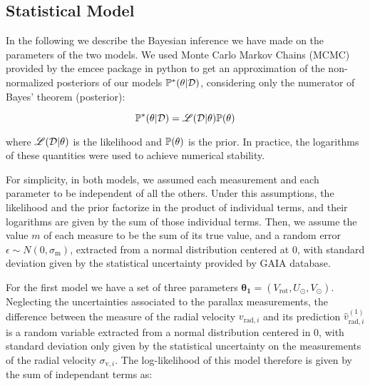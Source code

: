 \subsection{Statistical Model}\label{subsec:StatisticalModel}
In the following we describe the Bayesian inference we have made on the parameters of the two models. 
We used Monte Carlo Markov Chains (MCMC) provided by the emcee package in python 
to get an approximation of the non-normalized posteriors of our models 
$\mathbb{P}^{*}(\theta \vert \mathcal{D})$, considering only the numerator of Bayes' theorem (posterior):

\begin{equation}\label{Eq:NonNormPosterior}
    \mathbb{P}^{*}(\theta \vert \mathcal{D}) = \mathscr{L}(\mathcal{D} \vert \theta) \mathbb{P}(\theta)
\end{equation}

\noindent where $\mathscr{L}(\mathcal{D} \vert \theta)$ is the likelihood and $\mathbb{P}(\theta)$ is the prior. In practice, the logarithms of these quantities were used to achieve numerical stability.

For simplicity, in both models, we assumed each measurement and each parameter to be independent of all the others. Under this assumptions, the likelihood and the prior factorize in the product of individual terms, and their logarithms are given by the sum of those individual terms. Then, we assume the value $m$ of each measure to be  the sum of its true value, and a random error $\epsilon \sim N(0, \sigma_\text{m})$, extracted from a normal distribution centered at 0, with standard deviation given by the statistical uncertainty provided by GAIA database.

For the first model we have a set of three parameters $\mathbf{\theta_1} = (V_{\text{rot}}, U_{\odot}, V_{\odot})$. 
Neglecting the uncertainties associated to the parallax measurements, the difference between the measure of the radial velocity $v_{\text{rad}, i}$ and its prediction $\hat{v}^{(1)}_{\text{rad}, i}$ is a random variable extracted from a normal distribution centered in 0, with standard deviation only given by the statistical uncertainty on the measurements of the radial velocity $\sigma_{\text{v},i}$. 
The log-likelihood of this model therefore is given by the sum of independant terms as:


